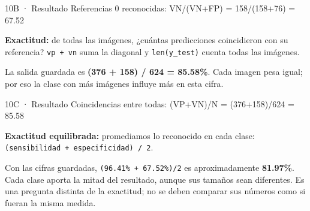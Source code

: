 
\begin{Salida}{10B · Resultado}
Referencias 0 reconocidas: VN/(VN+FP) = 158/(158+76) = 67.52%
\end{Salida}

\label{paso-10c}

\textbf{Exactitud:} de todas las imágenes, ¿cuántas predicciones coincidieron con su referencia? \texttt{\small vp + vn} suma la diagonal y \texttt{\small len(\allowbreak{}y\_\allowbreak{}test)\allowbreak{}} cuenta todas las imágenes.

La salida guardada es \textbf{(376 + 158) / 624 = 85.58\%}. Cada imagen pesa igual; por eso la clase con más imágenes influye más en esta cifra.



\begin{Salida}{10C · Resultado}
Coincidencias entre todas: (VP+VN)/N = (376+158)/624 = 85.58%
\end{Salida}

\label{paso-10d}

\textbf{Exactitud equilibrada:} promediamos lo reconocido en cada clase: \texttt{\small (\allowbreak{}sensibilidad + especificidad)\allowbreak{} /\allowbreak{} 2}.

Con las cifras guardadas, \texttt{\small (\allowbreak{}96.\allowbreak{}41\% + 67.\allowbreak{}52\%)\allowbreak{}/\allowbreak{}2} es aproximadamente \textbf{81.97\%}. Cada clase aporta la mitad del resultado, aunque sus tamaños sean diferentes. Es una pregunta distinta de la exactitud; no se deben comparar sus números como si fueran la misma medida.



